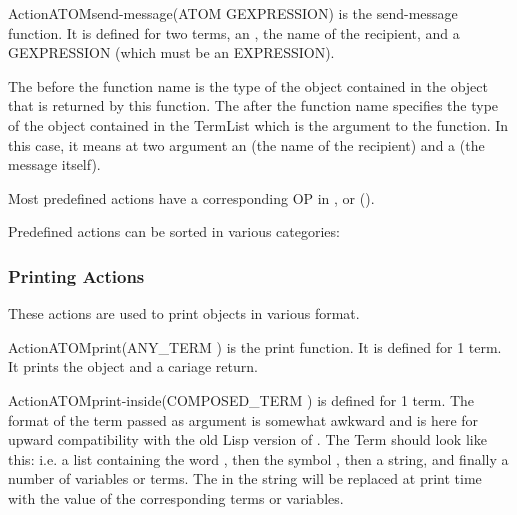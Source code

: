 \begin{typeefa}{Action}{ATOM}{send-message}{(ATOM GEXPRESSION)}
is the send-message function. It is defined for two terms, an , the
name of the recipient, and a GEXPRESSION (which must be an EXPRESSION).
\end{typeefa}

The  before the function name  is the type of the
object contained in the  object that is returned by this
 function.  The  after the function
name specifies the type of the object contained in the TermList which is the
argument to the  function. In this case, it means at two
argument an  (the name of the recipient) and a 
(the message itself).

Most predefined actions have a corresponding OP in ,
 or  ().

Predefined actions can be sorted in various categories:



\subsubsection{Printing Actions}

These actions are used to print objects in various format.

\begin{typeefa}{Action}{ATOM}{print}{(ANY\_TERM )} is the print
function. It is defined for 1 term. It prints the object and a cariage return.
\end{typeefa}

\begin{typeefa}{Action}{ATOM}{print-inside}{(COMPOSED\_TERM )}
is defined for 1 term. The format of the term passed as argument is somewhat
awkward and is here for upward compatibility with the old Lisp version of
\OPRS{}. The Term should look like this: \*
\*
i.e. a list containing the word , then the symbol
, then a string, and finally a number of variables or terms.
The  in the string will be replaced at print time with the value of
the corresponding terms or variables.
\end{typeefa}


